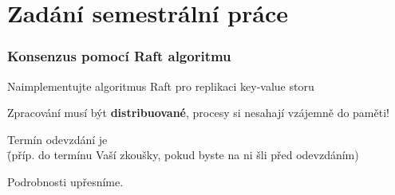 \documentclass[usenames,dvipsnames,9pt]{beamer}
\begin{document}
\section{Zadání semestrální práce}
\begin{frame}
  \frametitle{Konsenzus pomocí Raft algoritmu}
 Naimplementujte algoritmus Raft pro replikaci key-value storu

 \vspace{2em}

  Zpracování musí být {\bf distribuované}, procesy si nesahají vzájemně do paměti!


    \pause\vspace{1.5em}

  \begin{tabbing}
      Termín odevzdání je \={\bf \semIIdeadline} \\
                          \={(příp. do termínu Vaší zkoušky, pokud byste na ni šli před odevzdáním)}
    \end{tabbing}

\raggedleft Podrobnosti upřesníme.


\end{frame}


\framefeedback{}
\end{document}
